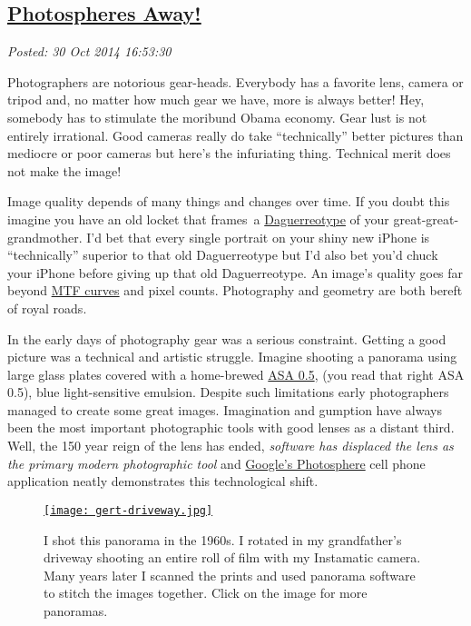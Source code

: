 %

\subsection*{\href{https://bakerjd99.wordpress.com/2014/10/30/photospheres-away-2/}{Photospheres Away!}}


\noindent\emph{Posted: 30 Oct 2014 16:53:30}
\vspace{6pt}

Photographers are notorious gear-heads. Everybody has a favorite lens,
camera or tripod and, no matter how much gear we have, more is always
better! Hey, somebody has to stimulate the moribund Obama economy. Gear
lust is not entirely irrational. Good cameras really do take
``technically'' better pictures than mediocre or poor cameras but here's
the infuriating thing. Technical merit does not make the image!

Image quality depends of many things and changes over time. If you doubt
this imagine you have an old locket that frames~a
\href{https://en.wikipedia.org/wiki/Daguerreotype}{Daguerreotype} of
your great-great-grandmother. I'd bet that every single portrait on your
shiny new iPhone is ``technically'' superior to that old Daguerreotype
but I'd also bet you'd chuck your iPhone before giving up that old
Daguerreotype. An image's quality goes far beyond
\href{http://photographylife.com/how-to-read-mtf-charts}{MTF curves} and
pixel counts. Photography and geometry are both bereft of royal roads.

In the early days of photography gear was a serious constraint. Getting
a good picture was a technical and artistic struggle. Imagine shooting a
panorama using large glass plates covered with a home-brewed
\href{http://www.alternativephotography.com/wp/processes/gelatin-silver/silver-gelatin-dry-plate-process}{ASA
0.5}, (you read that right ASA 0.5), blue light-sensitive emulsion.
Despite such limitations early photographers managed to create some
great images. Imagination and gumption have always been the most
important photographic tools with good lenses as a distant third. Well,
the 150 year reign of the lens has ended, \emph{software has displaced
the lens as the primary modern photographic tool} and
\href{https://itunes.apple.com/us/app/photo-sphere-camera/id904418768}{Google's
Photosphere} cell phone application neatly demonstrates this
technological shift.

\captionsetup[figure]{labelformat=empty}
\begin{figure}[htbp]
\centering
\href{http://conceptcontrol.smugmug.com/Themes/Manipulations/Panoramas-1}{\texttt{[image: gert-driveway.jpg]}}
\caption[I shot this panorama in the 1960s]{I shot this panorama in the 1960s. I rotated in my grandfather's
driveway shooting an entire roll of film with my Instamatic camera. Many
years later I scanned the prints and used panorama software to stitch
the images together. Click on the image for more
panoramas.}
\label{fig:4832X0}
\end{figure}


